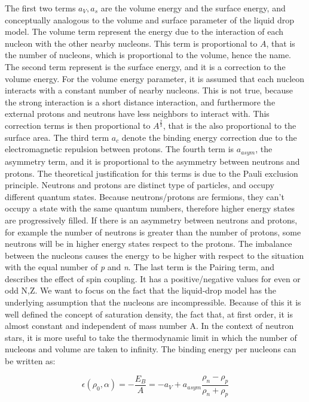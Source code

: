The first two terms $a_{V},a_{s}$ are the volume energy and the surface energy, and conceptually analogous to the volume and surface parameter of the liquid drop model. The volume term represent the energy due to the interaction of each nucleon with the other nearby nucleons. This term is proportional to $A$, that is the number of nucleons, which is proportional to the volume, hence the name. The second term represent is the surface energy, and it is a correction to the volume energy. For the volume energy parameter, it is assumed that each nucleon interacts with a constant number of nearby nucleons. This is not true, because the strong interaction is a short distance interaction, and furthermore the external protons and neutrons have less neighbors to interact with. This correction terms is then proportional to $A^{\frac{2}{3}}$, that is the also proportional to the surface area. 
The third term $a_{c}$ denote the binding energy correction due to the electromagnetic repulsion between protons. The fourth term is $a_{asym}$, the asymmetry term, and it is proportional to the asymmetry between neutrons and protons. The theoretical justification for this terms is due to the Pauli exclusion principle. Neutrons and protons are distinct type of particles, and occupy different quantum states. Because neutrons/protons are fermions, they can't occupy a state with the same quantum numbers, therefore higher energy states are progressively filled. If there is an asymmetry between neutrons and protons, for example the number of neutrons is greater than the number of protons, some neutrons will be in higher energy states respect to the protons. The imbalance between the nucleons causes the energy to be higher with respect to the situation with the equal number of \textit{p} and \textit{n}. 
The last term is the Pairing term, and describes the effect of spin coupling. It has a positive/negative values for even or odd N,Z. 
We want to focus on the fact that the liquid-drop model has the underlying assumption that the nucleons are incompressible. Because of this it is well defined the concept of saturation density, the fact that, at first order, it is almost constant and independent of mass number A.
In the context of neutron stars, it is more useful to take the thermodynamic limit in which the number of nucleons and volume are taken to infinity. The binding energy per nucleons can be written as:

\begin{equation}
\epsilon (\rho_{0}, \alpha) = -\frac{E_{B}}{A} = -a_{V} + a_{asym} \dfrac{\rho_{n} - \rho_{p}}{\rho_{n} + \rho_{p}}
\end{equation}

